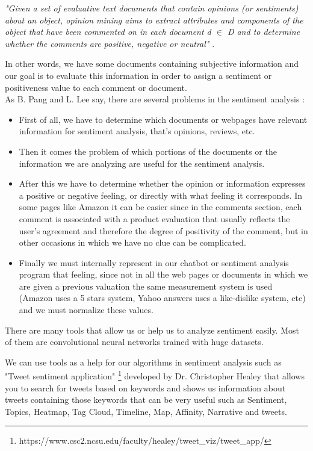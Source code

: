 \documentclass[12pt,twoside]{article}
\theoremstyle{plain}
\theoremstyle{definition}
\theoremstyle{remark}
\begin{document}
		\begin{center}
			\textit{"Given a set of evaluative text documents that contain opinions (or sentiments) about an object, opinion mining aims to extract attributes and components of the object that have been commented on in each document d $\in$ D and to determine whether the comments are positive, negative or neutral"} \cite{bingliu_sentiment_definition}.
		\end{center}
		
		In other words, we have some documents containing subjective information and our goal is to evaluate this information in order to assign a sentiment or positiveness value to each comment or document.\\
		
		As B. Pang and L. Lee say, there are several problems in the sentiment analysis \cite{sentiment_analysis_bpang_llee}:
		
		\begin{itemize}
			\item First of all, we have to determine which documents or webpages have relevant information for sentiment analysis, that's opinions, reviews, etc.
			\item Then it comes the problem of which portions of the documents or the information we are analyzing are useful for the sentiment analysis.
			\item After this we have to determine whether the opinion or information expresses a positive or negative feeling, or directly with what feeling it corresponds. In some pages like 
					Amazon it can be easier since in the comments section, each comment is associated with a product evaluation that usually reflects the user's agreement and therefore the degree of positivity of the comment, but in other occasions in which we have no clue can be complicated.
			\item Finally we must internally represent in our chatbot or sentiment analysis program that feeling, since not in all the web pages or documents in which we are given a previous
				 	valuation the same measurement system is used (Amazon uses a 5 stars system, Yahoo answers uses a like-dislike system, etc) and we must normalize these values.
		\end{itemize}
	
		There are many tools that allow us or help us to analyze sentiment easily. Most of them are convolutional neural networks trained with huge datasets.
		
		We can use tools as a help for our algorithms in sentiment analysis such as "Tweet sentiment application" \footnote{https://www.csc2.ncsu.edu/faculty/healey/tweet\_viz/tweet\_app/} developed by Dr. Christopher Healey that allows you to search for tweets based on keywords and shows us information about tweets containing those keywords that can be very useful such as Sentiment, Topics, Heatmap, Tag Cloud, Timeline, Map, Affinity, Narrative and tweets. \\
		
\end{document}
